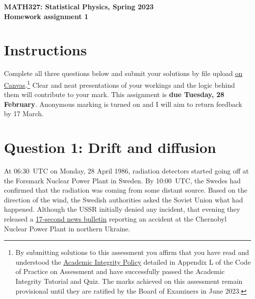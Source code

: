 \documentclass[12 pt]{article} %
\begin{document}
\newcommand{\thisweek}{MATH327 Homework 1}
\newcommand{\moddate}{Last modified 17 Feb.~2023}
\begin{center}
  {\Large \textbf{MATH327: Statistical Physics, Spring 2023}} \\[12 pt]
  {\Large \textbf{Homework assignment 1}} \\[24 pt]
\end{center}

\section*{Instructions}
Complete all three questions below and submit your solutions by file upload \href{https://canvas.liverpool.ac.uk/courses/60601/assignments/226600}{on Canvas}.\footnote{By submitting solutions to this assessment you affirm that you have read and understood the \href{https://www.liverpool.ac.uk/media/livacuk/tqsd/code-of-practice-on-assessment/appendix_L_cop_assess.pdf}{Academic Integrity Policy} detailed in Appendix L of the Code of Practice on Assessment and have successfully passed the Academic Integrity Tutorial and Quiz.  The marks achieved on this assessment remain provisional until they are ratified by the Board of Examiners in June 2023.}
Clear and neat presentations of your workings and the logic behind them will contribute to your mark.
This assignment is \textbf{due Tuesday, 28 February}.
Anonymous marking is turned on and I will aim to return feedback by 17 March. %



\vfill
\section*{Question 1: Drift and diffusion}
At 06:30~UTC on Monday, 28 April 1986, radiation detectors started going off at the Forsmark Nuclear Power Plant in Sweden.
By 10:00~UTC, the Swedes had confirmed that the radiation was coming from some distant source.
Based on the direction of the wind, the Swedish authorities asked the Soviet Union what had happened.
Although the USSR initially denied any incident, that evening they released a \href{https://www.youtube.com/watch?v=sC7n_QgJRks}{17-second news bulletin} reporting an accident at the Chernobyl Nuclear Power Plant in northern Ukraine.
\end{document}
